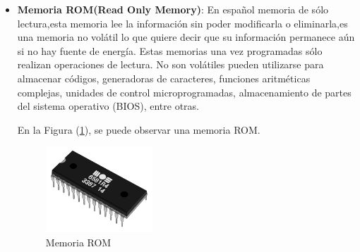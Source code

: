 \documentclass{article}
\begin{document}
\begin{itemize}
\begin{itemize}
    \end{itemize}
   \newpage
    
    \item \textbf{Memoria ROM(Read Only Memory)}: En español memoria de sólo lectura,esta memoria lee la información sin poder modificarla o eliminarla,es una memoria no volátil lo que quiere decir que su información permanece aún si no hay fuente de energía.\newline
    Estas memorias una vez programadas sólo realizan operaciones de lectura. No son volátiles pueden utilizarse para almacenar códigos, generadoras de caracteres, funciones aritméticas complejas, unidades de control microprogramadas, almacenamiento de partes del sistema operativo (BIOS), entre otras\cite{refUNT}.
    
    En la Figura (\ref{fig:rom}), se puede observar una memoria ROM.
    \begin{figure}[h]
    \includegraphics[width=4cm]{rom.png}
    \centering
    \caption{Memoria ROM\cite{img2}}
    \label{fig:rom}
    \end{figure}
    
    
\end{itemize}
\end{document}
